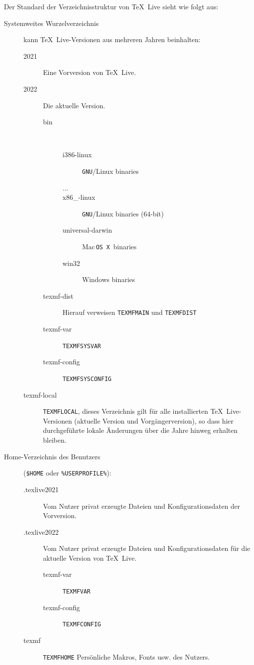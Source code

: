 \documentclass[12pt,ngerman,a4paper,fullparskip]{report}
\newcommand{\TL}{\TeX\ Live\xspace}
\newcommand{\acro}[1]{\texttt{#1}}
\newcommand{\envname}[1]{\texttt{#1}}
\providecommand*{\GNU}{\acro{GNU}\xspace}
\providecommand*{\MacOSX}{Mac\,\acro{OS\,X}\xspace}
\begin{document}
Der Standard der Verzeichnisstruktur von \TL sieht wie folgt aus:
\begin{description}
  \item[Systemweites Wurzelverzeichnis] kann \TL{}-Versionen aus mehreren Jahren beinhalten:
  \begin{description}
    \item[2021] Eine Vorversion von \TL.
    \item[2022] Die aktuelle Version.
    \begin{description}
      \item [bin] ~
      \begin{description}
        \item [i386-linux] \GNU/Linux binaries
        \item [...]
        \item [x86\_-linux] \GNU/Linux binaries (64-bit)
        \item [universal-darwin] \MacOSX\ binaries
        \item [win32] Windows binaries
      \end{description}
      \item [texmf-dist\ \ ] Hierauf verweisen \envname{TEXMFMAIN} und \envname{TEXMFDIST}
      \item [texmf-var\ \ ] \envname{TEXMFSYSVAR}
      \item [texmf-config \ \ ] \envname{TEXMFSYSCONFIG}
    \end{description}
    \item [texmf-local] \envname{TEXMFLOCAL}, dieses Verzeichnis gilt für alle installierten \TL-Versionen
         (aktuelle Version und Vorgängerversion), so dass hier durchgeführte lokale Änderungen über die
         Jahre hinweg erhalten bleiben.
  \end{description}
  \item[Home-Verzeichnis des Benutzers]
      (\texttt{\$HOME} oder \texttt{\%USERPROFILE\%}):
    \begin{description}
      \item[.texlive2021] Vom Nutzer privat erzeugte Dateien und Konfigurationsdaten
        der Vorversion.
      \item[.texlive2022] Vom Nutzer privat erzeugte Dateien und Konfigurationsdaten
        für die aktuelle Version von \TL.
      \begin{description}
        \item [texmf-var\ \ \ ] \envname{TEXMFVAR}
        \item [texmf-config] \envname{TEXMFCONFIG}
      \end{description}
    \item[texmf] \envname{TEXMFHOME} Persönliche Makros, Fonts usw. des Nutzers.
  \end{description}
\end{description}
\end{document}
